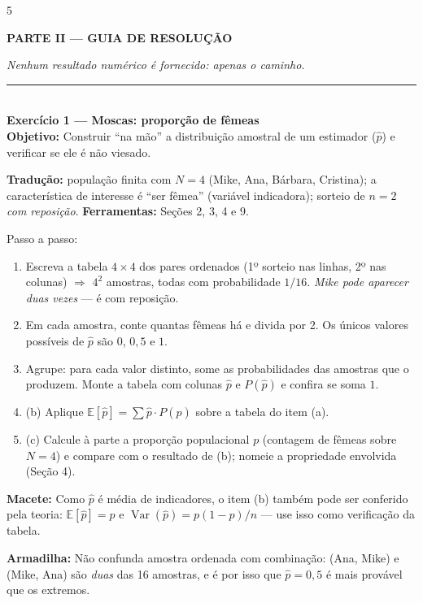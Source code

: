 \documentclass[a4paper,8pt]{extarticle}
\newcommand{\tit}[1]{\vspace{2pt}\textcolor{azul}{\rule{\linewidth}{0.6pt}}\\[1pt]\textbf{\textcolor{azul}{#1}}\\[1pt]}
\newcommand{\mac}[1]{\textcolor{verde}{\textbf{Macete:}} #1\par}
\newcommand{\arm}[1]{\textcolor{vinho}{\textbf{Armadilha:}} #1\par}
\newcommand{\ferr}[1]{\textbf{Ferramentas:} #1\par}
\newcommand{\obj}[1]{\textbf{Objetivo:} #1\par}
\newcommand{\E}{\mathbb{E}}
\newcommand{\Var}{\operatorname{Var}}
\begin{document}
\begin{multicols*}{5}
\vspace{4pt}
\begin{center}\colorbox{cinza}{\parbox{0.94\linewidth}{\centering\bfseries\color{azul} PARTE II — GUIA DE RESOLUÇÃO}}\end{center}
\textit{Nenhum resultado numérico é fornecido: apenas o caminho.}

\tit{Exercício 1 — Moscas: proporção de fêmeas}
\obj{Construir “na mão” a distribuição amostral de um estimador ($\hat p$) e verificar se ele é não viesado.}
\textbf{Tradução:} população finita com $N=4$ (Mike, Ana, Bárbara, Cristina); a característica de interesse é “ser fêmea” (variável indicadora); sorteio de $n=2$ \emph{com reposição}.
\ferr{Seções 2, 3, 4 e 9.}
Passo a passo:
\begin{enumerate}
\item Escreva a tabela $4\times4$ dos pares ordenados (1º sorteio nas linhas, 2º nas colunas) $\Rightarrow$ $4^2$ amostras, todas com probabilidade $1/16$. \emph{Mike pode aparecer duas vezes} — é com reposição.
\item Em cada amostra, conte quantas fêmeas há e divida por 2. Os únicos valores possíveis de $\hat p$ são $0$, $0{,}5$ e $1$.
\item Agrupe: para cada valor distinto, some as probabilidades das amostras que o produzem. Monte a tabela com colunas $\hat p$ e $P(\hat p)$ e confira se soma $1$.
\item (b) Aplique $\E[\hat p]=\sum \hat p\cdot P(\hat p)$ sobre a tabela do item (a).
\item (c) Calcule à parte a proporção populacional $p$ (contagem de fêmeas sobre $N=4$) e compare com o resultado de (b); nomeie a propriedade envolvida (Seção 4).
\end{enumerate}
\mac{Como $\hat p$ é média de indicadores, o item (b) também pode ser conferido pela teoria: $\E[\hat p]=p$ e $\Var(\hat p)=p(1-p)/n$ — use isso como verificação da tabela.}
\arm{Não confunda amostra ordenada com combinação: (Ana, Mike) e (Mike, Ana) são \emph{duas} das 16 amostras, e é por isso que $\hat p=0{,}5$ é mais provável que os extremos.}


\end{multicols*}
\end{document}
